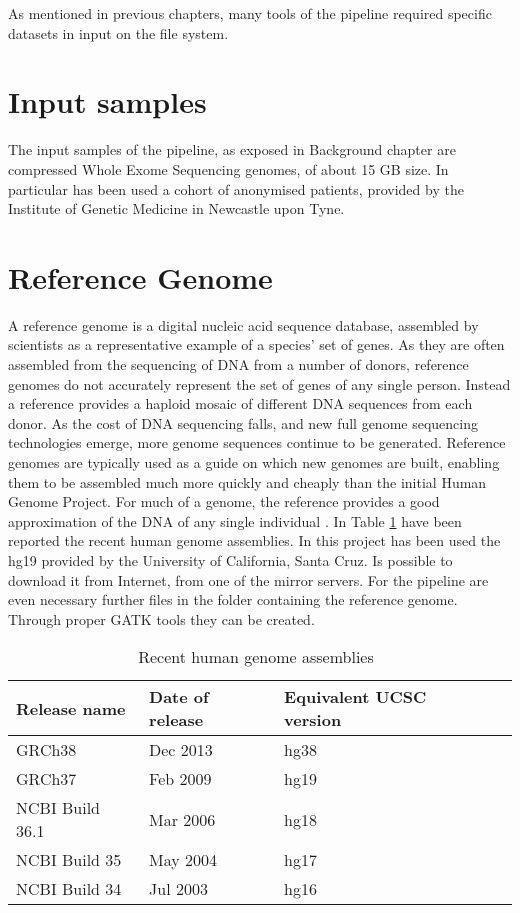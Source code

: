 As mentioned in previous chapters, many tools of the pipeline required specific datasets in input on the file system.


\section{Input samples}
The input samples of the pipeline, as exposed in Background chapter are compressed Whole Exome Sequencing genomes, of about 15 GB size. In particular has been used a cohort of anonymised patients, provided by the Institute of Genetic Medicine in Newcastle upon Tyne.

\section{Reference Genome}
A reference genome is a digital nucleic acid sequence database, assembled by scientists as a representative example of a species' set of genes. As they are often assembled from the sequencing of DNA from a number of donors, reference genomes do not accurately represent the set of genes of any single person. Instead a reference provides a haploid mosaic of different DNA sequences from each donor.\newline
As the cost of DNA sequencing falls, and new full genome sequencing technologies emerge, more genome sequences continue to be generated. Reference genomes are typically used as a guide on which new genomes are built, enabling them to be assembled much more quickly and cheaply than the initial Human Genome Project. For much of a genome, the reference provides a good approximation of the DNA of any single individual \cite{WIKI:reference_genome}.\newline
In Table \ref{human_genomes} have been reported the recent human genome assemblies. In this project has been used the hg19 provided by the University of California, Santa Cruz. Is possible to download it from Internet, from one of the mirror servers. For the pipeline are even necessary further files in the folder containing the reference genome. Through proper GATK tools they can be created.


\begin{table}[h]
	\caption{Recent human genome assemblies~\label{human_genomes}}
	\begin{center}
		\begin{tabular}{| l | l | l | l |}
    		\hline
    		Release name & Date of release & Equivalent UCSC version \\ \hline
		    GRCh38	&	Dec 2013	&	hg38 \\ \hline
			GRCh37	&	Feb 2009	&	hg19 \\ \hline
			NCBI Build 36.1	&	Mar 2006	&	hg18 \\ \hline
			NCBI Build 35	&	May 2004	&	hg17 \\ \hline
			NCBI Build 34	&	Jul 2003	&	hg16 \\ \hline
    	\end{tabular}
    \end{center}
\end{table}


